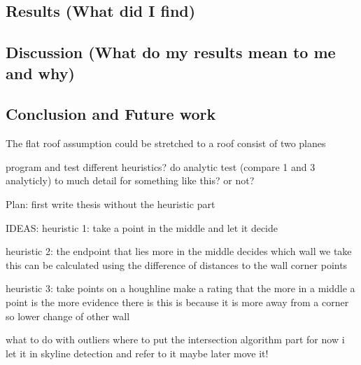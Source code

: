 \subsection{Results (What did I find)}
\subsection{Discussion (What do my results mean to me and why)}
\subsection{Conclusion and Future work}
The flat roof assumption could be stretched to a roof consist of two planes


program and test different heuristics?
do analytic test (compare 1 and 3 analyticly)
	to much detail for something like this? or not?

Plan:
first write thesis without the heuristic part

IDEAS:
heuristic 1:
take a point in the middle and let it decide

heuristic 2:
the endpoint that lies more in the middle decides which wall we take
this can be calculated using the difference of distances to the wall corner points

heuristic 3:
take points on a houghline
make a rating that the more in a middle a point is the more evidence there is
this is because it is more away from a corner so lower change of other wall


what to do with outliers
where to put the intersection algorithm part
for now i let it in skyline detection and refer to it
maybe later move it!



